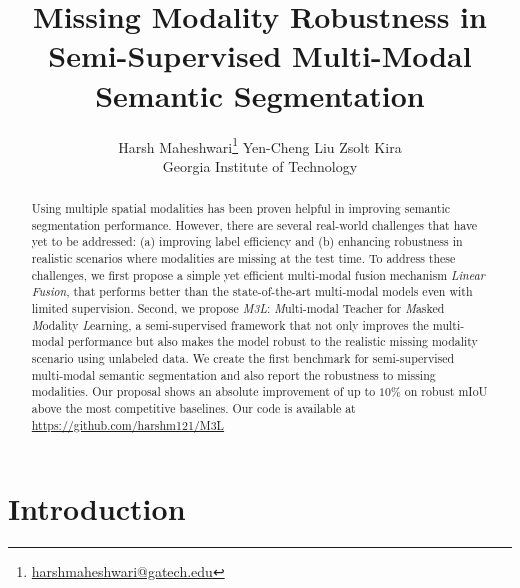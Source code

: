 \documentclass[10pt,twocolumn,letterpaper]{article}
\begin{document}
\title{Missing Modality Robustness in Semi-Supervised Multi-Modal \\Semantic Segmentation}

\author{Harsh Maheshwari\thanks{\href{mailto:harshmaheshwari@gatech.edu}{harshmaheshwari@gatech.edu}}
\qquad
Yen-Cheng Liu
\qquad
Zsolt Kira\\
Georgia Institute of Technology\\
}

\maketitle
\ifxfinal\thispagestyle{empty}\fi


\begin{abstract}
   Using multiple spatial modalities has been proven helpful in improving semantic segmentation performance.
    However, there are several real-world challenges that have yet to be addressed: (a) improving label efficiency and (b) enhancing robustness in realistic scenarios where modalities are missing at the test time. To address these challenges, we first propose a simple yet efficient multi-modal fusion mechanism \emph{Linear Fusion}, that performs better than the state-of-the-art multi-modal models even with limited supervision. Second, we propose \emph{M3L}: \emph{M}ulti-modal Teacher for \emph{M}asked \emph{M}odality \emph{L}earning, a semi-supervised framework that not only improves the multi-modal performance but also makes the model robust to the realistic missing modality scenario using unlabeled data. We create the first benchmark for semi-supervised multi-modal semantic segmentation and also report the robustness to missing modalities. Our proposal shows an absolute improvement of up to $10\%$ on robust mIoU above the most competitive baselines. Our code is available at \href{https://github.com/harshm121/M3L}{https://github.com/harshm121/M3L}
\end{abstract}

\section{Introduction}
\end{document}
